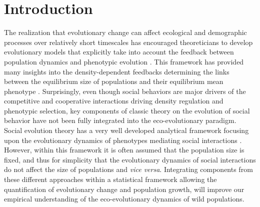 \documentclass{article}
\begin{document}
\section{Introduction}
 The realization that evolutionary change can affect ecological and demographic processes over relatively short timescales has encouraged theoreticians to develop evolutionary models that explicitly take into account the feedback between population dynamics and phenotypic evolution \citep{Govaert2019, hendry2016eco}. This framework has provided many insights into the density-dependent feedbacks determining the links between the equilibrium size of populations and their equilibrium mean phenotype \citep{MacArthur1962, Charlesworth1994, Lande2009a, Engen2013, Engen2020}. Surprisingly, even though social behaviors are major drivers of the competitive and cooperative interactions driving density regulation and phenotypic selection, key components of classic theory on the evolution of social behavior have not been fully integrated into the eco-evolutionary paradigm. Social evolution theory has a very well developed analytical framework focusing upon the evolutionary dynamics of phenotypes mediating social interactions \citep{frank1998foundations, Wolf1999SocialSelection, Queller1985a, Queller2017, Araya-Ajoy2020}. However, within this framework it is often assumed that the population size is fixed, and thus for simplicity that the evolutionary dynamics of social interactions do not affect the size of populations and  \textit{vice versa}. Integrating components from these different approaches within a statistical framework allowing the quantification of evolutionary change and population growth, will improve our empirical understanding of the eco-evolutionary dynamics of wild populations.
\end{document}
